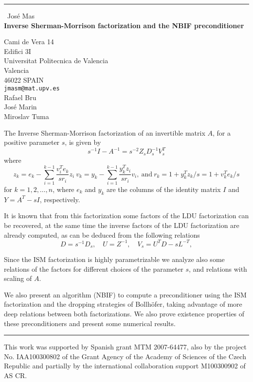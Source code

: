 \documentclass{report}
\begin{document}
\begin{center}
\rule{6in}{1pt} \
{\large Jos\'e Mas \\
{\bf Inverse Sherman-Morrison factorization and the NBIF preconditioner}}

Cami de Vera 14 \\ Edifici 3I \\ Universitat Politecnica de Valencia \\ Valencia \\ 46022 SPAIN
\\
{\tt jmasm@mat.upv.es}\\
Rafael Bru\\
Jos\'e Marin\\
Miroslav Tuma\end{center}


The Inverse Sherman-Morrison factorization of an
invertible matrix $A$, for a positive parameter $s$, is given by
\begin{equation*}
s^{-1}I - {A}^{-1} = s^{-2} Z_s D_s^{-1} V_s^T
\end{equation*}
where
\begin{equation*}
z_k=e_k-\sum_{i=1}^{k-1}\frac{v_i^T e_k}{s r_i} z_i
\ v_k=y_k-\sum_{i=1}^{k-1}\frac{y^T_k z_i}{sr_i}v_i,
\ \text{and} \ r_k=1+y^T_kz_k/s=1+v^T_k e_k/s
\end{equation*}
for $k=1,2,\ldots,n$, where
$e_k$ and $y_k$ are
the columns of the identity matrix $I$ and $Y=A^T-sI$, respectively.

It is known that from this factorization some factors of the LDU factorization
can be recovered, at the same time the inverse factors of the LDU factorization
are already computed, as can be deduced from the following relations
\begin{equation*}
{D}=s^{-1}D_s, \quad {U}= Z^{-1},
\quad V_s = {U}^T {D} - s {L}^{-T},
\end{equation*}

Since the ISM factorization is
highly parametrizable we analyze also some relations of the factors for
different choices of the parameter $s$, and relations with scaling of $A$.


We also present an algorithm (NBIF) to compute a preconditioner using the
ISM factorization and
the dropping strategies of Bollh\"ofer, taking advantage of more deep
relations between both factorizations.
We also prove existence properties of these preconditioners and present some numerical
results.

\bigskip
\hrule
\vspace*{3pt}
\begin{footnotesize}
This work was supported by Spanish grant MTM 2007-64477,
also by the project No. IAA100300802 of the Grant Agency of the Academy
of Sciences of the Czech Republic
and partially by the international collaboration support M100300902
of AS CR.
\end{footnotesize}
\end{document}
